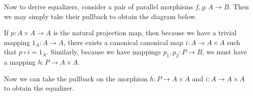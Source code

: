     Now to derive equalizers, consider a pair of parallel morphisms 
    $f, g: A \to B$. Then we may simply take their pullback to obtain the diagram below. 
    \begin{center}
    \end{center}
    If $p: A \times A \to A$ is the natural projection map, then 
    because we have a trivial mapping $1_A: A \to A$, there exists a canonical 
    canonical map $i: A \to A \times A$ such that $p \circ i = 1_A$. 
    Similarly, because we have mappings $p_1, p_2: P \to B$, we must have a 
    mapping $h: P \to A \times A$. 
    \begin{center}
        \hspace{1cm}
    \end{center}
    Now we can take the pullback on the morphism $h: P \to A \times A$ 
    and $i: A \to A \times A$ to obtain the equalizer.  
